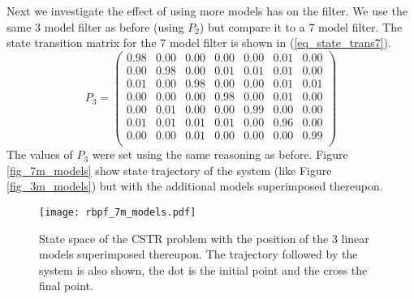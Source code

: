Next we investigate the effect of using more models has on the filter. We use the same 3 model filter as before (using $P_2$) but compare it to a 7 model filter. The state transition matrix for the 7 model filter is shown in (\ref{eq_state_trans7}).
\begin{equation}
P_3 = \begin{pmatrix}
0.98 & 0.00 & 0.00 & 0.00 & 0.00 & 0.01 & 0.00 \\
0.00 & 0.98 & 0.00 & 0.01 & 0.01 & 0.01 & 0.00 \\
0.01 & 0.00 & 0.98 & 0.00 & 0.00 & 0.01 & 0.01 \\
0.00 & 0.00 & 0.00 & 0.98 & 0.00 & 0.01 & 0.00 \\
0.00 & 0.01 & 0.00 & 0.00 & 0.99 & 0.00 & 0.00 \\
0.01 & 0.01 & 0.01 & 0.01 & 0.00 & 0.96 & 0.00 \\
0.00 & 0.00 & 0.01 & 0.00 & 0.00 & 0.00 & 0.99 \\
\end{pmatrix}
\label{eq_state_trans7}
\end{equation}
The values of $P_3$ were set using the same reasoning as before. Figure \ref{fig_7m_models} show state trajectory of the system (like Figure \ref{fig_3m_models}) but with the additional models superimposed thereupon.
\begin{figure}[H] 
\centering
\texttt{[image: rbpf\_7m\_models.pdf]}
\caption{State space of the CSTR problem with the position of the 3 linear models superimposed thereupon. The trajectory followed by the system is also shown, the dot is the initial point and the cross the final point.}
\label{fig_7m_model}
\end{figure}


